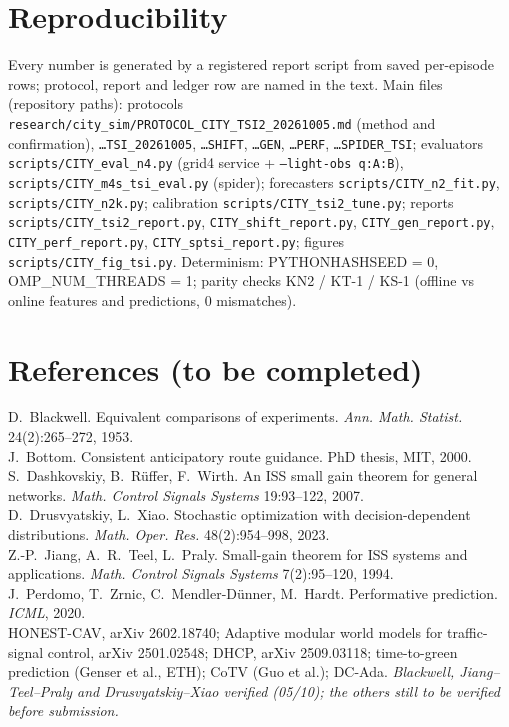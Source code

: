 \documentclass[11pt]{article}
\begin{document}
\section{Reproducibility}
Every number is generated by a registered report script from saved per-episode rows; protocol, report and ledger row are named in the
text. Main files (repository paths): protocols \texttt{research/city\_sim/PROTOCOL\_CITY\_TSI2\_20261005.md} (method and confirmation),
\texttt{\dots TSI\_20261005}, \texttt{\dots SHIFT}, \texttt{\dots GEN}, \texttt{\dots PERF}, \texttt{\dots SPIDER\_TSI}; evaluators
\texttt{scripts/CITY\_eval\_n4.py} (grid4 service + \texttt{--light-obs q:A:B}), \texttt{scripts/CITY\_m4s\_tsi\_eval.py} (spider);
forecasters \texttt{scripts/CITY\_n2\_fit.py}, \texttt{scripts/CITY\_n2k.py}; calibration \texttt{scripts/CITY\_tsi2\_tune.py};
reports \texttt{scripts/CITY\_tsi2\_report.py}, \texttt{CITY\_shift\_report.py}, \texttt{CITY\_gen\_report.py}, \texttt{CITY\_perf\_report.py},
\texttt{CITY\_sptsi\_report.py}; figures \texttt{scripts/CITY\_fig\_tsi.py}. Determinism: PYTHONHASHSEED = 0, OMP\_NUM\_THREADS = 1; parity
checks KN2 / KT-1 / KS-1 (offline vs online features and predictions, 0 mismatches).

\section*{References (to be completed)}
\small
D.~Blackwell. Equivalent comparisons of experiments. \emph{Ann. Math. Statist.} 24(2):265--272, 1953.\\
J.~Bottom. Consistent anticipatory route guidance. PhD thesis, MIT, 2000.\\
S.~Dashkovskiy, B.~R\"uffer, F.~Wirth. An ISS small gain theorem for general networks. \emph{Math. Control Signals Systems} 19:93--122, 2007.\\
D.~Drusvyatskiy, L.~Xiao. Stochastic optimization with decision-dependent distributions. \emph{Math. Oper. Res.} 48(2):954--998, 2023.\\
Z.-P.~Jiang, A.~R.~Teel, L.~Praly. Small-gain theorem for ISS systems and applications. \emph{Math. Control Signals Systems} 7(2):95--120, 1994.\\
J.~Perdomo, T.~Zrnic, C.~Mendler-D\"unner, M.~Hardt. Performative prediction. \emph{ICML}, 2020.\\
HONEST-CAV, arXiv 2602.18740; Adaptive modular world models for traffic-signal control, arXiv 2501.02548; DHCP, arXiv 2509.03118;
time-to-green prediction (Genser et al., ETH); CoTV (Guo et al.); DC-Ada. \emph{Blackwell, Jiang--Teel--Praly and Drusvyatskiy--Xiao verified (05/10); the others still to be verified before submission.}
\normalsize
\end{document}
